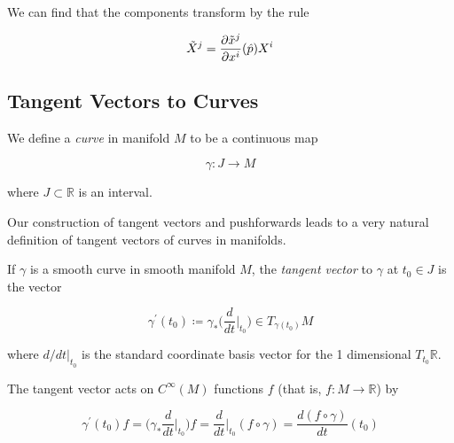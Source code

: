 \documentclass{article}
\newcounter{definition}[section]
\begin{document}
      We can find that the components transform by the rule 

        \begin{equation}
          \Tilde{X}^j = \frac{\partial \Tilde{x}^j}{\partial x^i} (\hat{p}) X^i
        \end{equation}

  \subsection{Tangent Vectors to Curves}

    \begin{definition}[Curve]
      \label{def:curve}
      We define a \textit{curve} in manifold $M$ to be a continuous map 

        \begin{equation}
          \gamma: J \to M
        \end{equation}

      where $J \subset \mathbb{R}$ is an interval. 
    \end{definition}

    Our construction of tangent vectors and pushforwards leads to a very natural definition of tangent vectors of curves in manifolds. 

    \begin{definition}
      \label{def:tangent-vector-to-a-curve}
      If $\gamma$ is a smooth curve in smooth manifold $M$, the \textit{tangent vector} to $\gamma$ at $t_0 \in J$ is the vector 

        \begin{equation}
          \gamma^\prime (t_0) \coloneqq \gamma_* \bigg( \frac{d}{dt} \bigg|_{t_0} \bigg) \in T_{\gamma(t_0)} M
        \end{equation}

      where $d/dt \big|_{t_0}$ is the standard coordinate basis vector for the 1 dimensional $T_{t_0} \mathbb{R}$. 
    \end{definition}

    The tangent vector acts on $C^\infty(M)$ functions $f$ (that is, $f: M \to \mathbb{R}$) by

      \begin{equation}
        \gamma^\prime (t_0) f = \bigg( \gamma_* \frac{d}{dt} \bigg|_{t_0} \bigg) f = \frac{d}{dt} \bigg|_{t_0} (f \circ \gamma) = \frac{d (f \circ \gamma)}{dt} (t_0)
      \end{equation}
    
\end{document}

